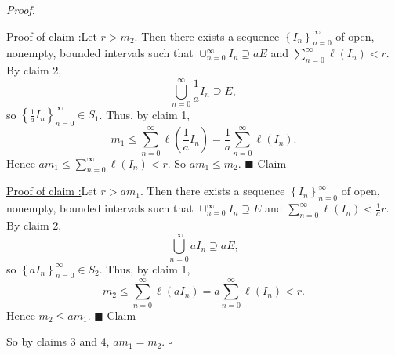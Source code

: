 \documentclass[12pt]{article}
\newcounter{ProofCounter}
\newcounter{ClaimCounter}[ProofCounter]
\newenvironment{Proof}{\stepcounter{ProofCounter}\textit{Proof.}}{\hfill$\square$}
\newenvironment{claim}[1]{\stepcounter{ClaimCounter}\par\noindent\underline{Claim \theClaimCounter:}\space#1}{}
\newenvironment{claimproof}[1]{\par\noindent\underline{Proof of claim \theClaimCounter:}\space#1}{\hfill $\blacksquare$ Claim \theClaimCounter\vspace{5mm}}
\begin{document}
\begin{Proof}
\begin{claimproof}
Let $r > m_{2}$. Then there exists a sequence $\left\{ I_{n} \right\}_{n=0}^{\infty}$ of open, nonempty, bounded intervals such that
$\cup_{n=0}^{\infty}I_{n} \supseteq aE$ and $\sum_{n=0}^{\infty}\ell(I_{n}) < r$. By claim 2, 
\[ \bigcup_{n=0}^{\infty}\frac{1}{a}I_{n} \supseteq E, \]
so $\left\{ \frac{1}{a}I_{n} \right\}_{n=0}^{\infty} \in S_{1}$. Thus, by claim 1, 
\[ m_{1} \leq \sum_{n=0}^{\infty}\ell\left(\frac{1}{a}I_{n}\right) = \frac{1}{a}\sum_{n=0}^{\infty}\ell(I_{n}). \]
Hence $am_{1} \leq \sum_{n=0}^{\infty}\ell(I_{n}) < r$. So $am_{1} \leq m_{2}$.
\end{claimproof}

\begin{claimproof}
Let $r > am_{1}$. Then there exists a sequence $\left\{ I_{n} \right\}_{n=0}^{\infty}$ of open, nonempty, bounded intervals such that 
$\cup_{n=0}^{\infty}I_{n} \supseteq E$ and $\sum_{n=0}^{\infty}\ell(I_{n}) < \frac{1}{a}r$. By claim 2,
\[ \bigcup_{n=0}^{\infty}aI_{n} \supseteq aE, \]
so $\left\{ aI_{n} \right\}_{n=0}^{\infty} \in S_{2}$. Thus, by claim 1,
\[ m_{2} \leq \sum_{n=0}^{\infty}\ell(aI_{n}) = a\sum_{n=0}^{\infty}\ell(I_{n}) < r. \]
Hence $m_{2} \leq am_{1}$.
\end{claimproof}

So by claims 3 and 4, $am_{1} = m_{2}$.
\end{Proof}
\end{document}
